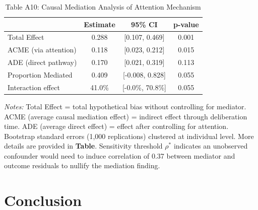 \documentclass[12pt]{article}
\begin{document}
\begin{table}[H]
\centering
\begin{threeparttable}
\caption{Table A10: Causal Mediation Analysis of Attention Mechanism}
\label{tab:ACME}
\vspace{1ex}
\begin{tabular}{@{}lccc@{}}
\toprule
 & \textbf{Estimate} & \textbf{95\% CI} & \textbf{p-value} \\
\midrule
Total Effect              & 0.288  & [0.107, 0.469]       & 0.001 \\
ACME (via attention)      & 0.118  & [0.023, 0.212]       & 0.015 \\
ADE (direct pathway)      & 0.170  & [0.021, 0.319]       & 0.113 \\
Proportion Mediated       & 0.409 & [-0.008, 0.828] & 0.055 \\
Interaction effect        & 41.0\% & [-0.0\%, 70.8\%]     & 0.055 \\
\bottomrule
\end{tabular}

\vspace{2ex}
\begin{tablenotes}[flushleft]
\footnotesize
\item \textit{Notes:} Total Effect = total hypothetical bias without controlling for mediator. ACME (average causal mediation effect) = indirect effect through deliberation time. ADE (average direct effect) = effect after controlling for attention.   Bootstrap standard errors (1{,}000 replications) clustered at individual level. More details are provided in \textbf{Table}. Sensitivity threshold $\rho^*$ indicates an unobserved confounder would need to induce correlation of 0.37 between mediator and outcome residuals to nullify the mediation finding. 
\end{tablenotes}

\end{threeparttable}
\end{table}








\section{Conclusion}
\label{Conclusion}
\end{document}
